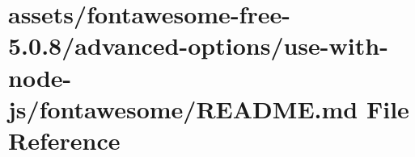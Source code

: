 \hypertarget{fontawesome-free-5_80_88_2advanced-options_2use-with-node-js_2fontawesome_2_r_e_a_d_m_e_8md}{}\section{assets/fontawesome-\/free-\/5.0.8/advanced-\/options/use-\/with-\/node-\/js/fontawesome/\+R\+E\+A\+D\+ME.md File Reference}
\label{fontawesome-free-5_80_88_2advanced-options_2use-with-node-js_2fontawesome_2_r_e_a_d_m_e_8md}
